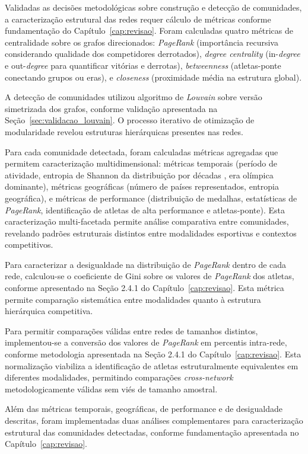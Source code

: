 Validadas as decisões metodológicas sobre construção e detecção de comunidades, a caracterização estrutural das redes requer cálculo de métricas conforme fundamentação do Capítulo~\ref{cap:revisao}. Foram calculadas quatro métricas de centralidade sobre os grafos direcionados: \textit{PageRank} (importância recursiva considerando qualidade dos competidores derrotados), \textit{degree centrality} (in-\textit{degree} e out-\textit{degree} para quantificar vitórias e derrotas), \textit{betweenness} (atletas-ponte conectando grupos ou eras), e \textit{closeness} (proximidade média na estrutura global).

A detecção de comunidades utilizou algoritmo de \textit{Louvain} \cite{Blondel2008Louvain} sobre versão simetrizada dos grafos, conforme validação apresentada na Seção~\ref{sec:validacao_louvain}. O processo iterativo de otimização de modularidade revelou estruturas hierárquicas presentes nas redes.

Para cada comunidade detectada, foram calculadas métricas agregadas que permitem caracterização multidimensional: métricas temporais (período de atividade, entropia de Shannon da distribuição por décadas \cite{Rajaram2017ShannonEntropy}, era olímpica dominante), métricas geográficas (número de países representados, entropia geográfica), e métricas de performance (distribuição de medalhas, estatísticas de \textit{PageRank}, identificação de atletas de alta performance e atletas-ponte). Esta caracterização multi-facetada permite análise comparativa entre comunidades, revelando padrões estruturais distintos entre modalidades esportivas e contextos competitivos.

Para caracterizar a desigualdade na distribuição de \textit{PageRank} dentro de cada rede, calculou-se o coeficiente de Gini sobre os valores de \textit{PageRank} dos atletas, conforme apresentado na Seção 2.4.1 do Capítulo~\ref{cap:revisao}. Esta métrica permite comparação sistemática entre modalidades quanto à estrutura hierárquica competitiva.

Para permitir comparações válidas entre redes de tamanhos distintos, implementou-se a conversão dos valores de \textit{PageRank} em percentis intra-rede, conforme metodologia apresentada na Seção 2.4.1 do Capítulo~\ref{cap:revisao}. Esta normalização viabiliza a identificação de atletas estruturalmente equivalentes em diferentes modalidades, permitindo comparações \textit{cross-network} metodologicamente válidas sem viés de tamanho amostral.

Além das métricas temporais, geográficas, de performance e de desigualdade descritas, foram implementadas duas análises complementares para caracterização estrutural das comunidades detectadas, conforme fundamentação apresentada no Capítulo~\ref{cap:revisao}.

